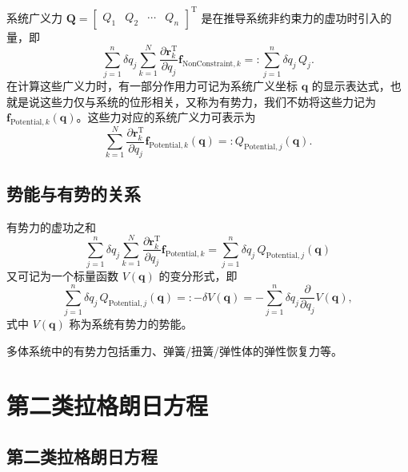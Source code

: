 系统广义力 $\boldsymbol{Q} = \begin{bmatrix} Q_1 & Q_2 & \cdots & Q_n \end{bmatrix}^{\mathrm{T}}$ 是在推导系统非约束力的虚功时引入的量，即
\begin{equation*}
\sum_{j=1}^{n} \delta q_j \sum_{k=1}^{N} \frac{\partial \boldsymbol{r}_k^{\mathrm{T}}}{\partial q_j} \boldsymbol{f}_{\text{NonConstraint},k} =: \sum_{j=1}^{n} \delta q_j \, Q_j.
\end{equation*}
在计算这些广义力时，有一部分作用力可记为系统广义坐标 $\boldsymbol{q}$ 的显示表达式，也就是说这些力仅与系统的位形相关，又称为有势力，我们不妨将这些力记为 $\boldsymbol{f}_{\text{Potential},k}(\boldsymbol{q})$。这些力对应的系统广义力可表示为
\begin{equation}\label{eq:2.22}
\sum_{k=1}^{N} \frac{\partial \boldsymbol{r}_k^{\mathrm{T}}}{\partial q_j} \boldsymbol{f}_{\text{Potential},k}(\boldsymbol{q}) =: Q_{\text{Potential},j}(\boldsymbol{q}).
\end{equation}

\subsection{势能与有势的关系}

有势力的虚功之和
\begin{equation*}
\sum_{j=1}^{n} \delta q_j \sum_{k=1}^{N} \frac{\partial \boldsymbol{r}_k^{\mathrm{T}}}{\partial q_j} \boldsymbol{f}_{\text{Potential},k} = \sum_{j=1}^{n} \delta q_j \, Q_{\text{Potential},j}(\boldsymbol{q})
\end{equation*}
又可记为一个标量函数 $V(\boldsymbol{q})$ 的变分形式，即
\begin{equation}\label{eq:2.23}
\sum_{j=1}^{n} \delta q_j \, Q_{\text{Potential},j}(\boldsymbol{q}) =: -\delta V(\boldsymbol{q}) = -\sum_{j=1}^{n} \delta q_j \frac{\partial}{\partial q_j} V(\boldsymbol{q}),
\end{equation}
式中 $V(\boldsymbol{q})$ 称为系统有势力的势能。

多体系统中的有势力包括重力、弹簧/扭簧/弹性体的弹性恢复力等。

\section{第二类拉格朗日方程}

\subsection{第二类拉格朗日方程}

